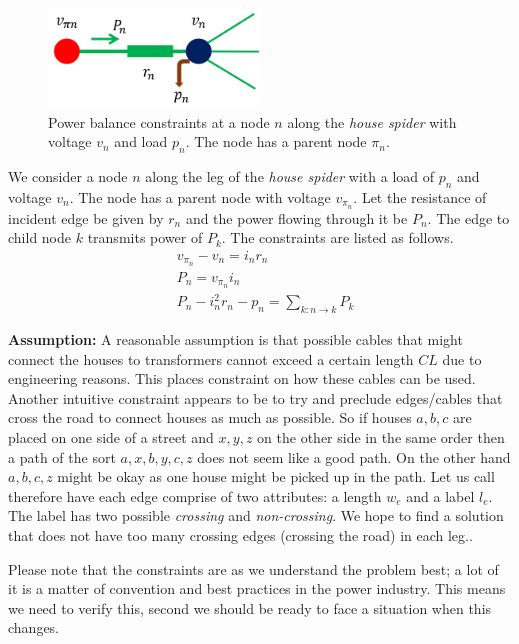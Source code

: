 \documentclass[11pt,letterpaper]{article}
\begin{document}
\begin{figure}[H]
	\centering
	\includegraphics[width=0.5\textwidth]{constraint-2}
	\caption{\color{blue}Power balance constraints at a node $n$ along the \emph{house spider} with voltage $v_n$ and load $p_n$. The node has a parent node $\pi_n$.}
	\label{fig-2}
\end{figure}
\noindent We consider a node $n$ along the leg of the \emph{house spider} with a load of $p_n$ and voltage $v_n$. The node has a parent node with voltage $v_{\pi_n}$. Let the resistance of incident edge be given by $r_n$ and the power flowing through it be $P_n$. The edge to child node $k$ transmits power of $P_k$. The constraints are listed as follows.
\begin{equation}
\begin{aligned}
&v_{\pi_n}-v_n=i_nr_n\\
&P_n=v_{\pi_n}i_n\\
&P_n-i_n^2r_n-p_n=\sum_{k:n\rightarrow k}P_k
\end{aligned}
\end{equation}

\color{black}
\noindent
\textbf{Assumption:} A reasonable assumption is that possible cables that might connect the houses to transformers cannot exceed a certain length 
$CL$ due to engineering reasons. This places constraint on how these cables can be used. Another intuitive constraint appears to
be to try and preclude edges/cables that cross the road to connect houses as much as possible. So if houses $a,b,c$ are placed on one side of a street and $x,y,z$ on the other side in the same order then a path of the sort $a,x,b,y,c,z$ does not seem like a good path. On the other hand
$a,b,c,z$ might be okay as one house might be picked up in the path.  Let us call therefore have each edge comprise of two attributes:
a length $w_e$ and a label $l_e$.  The label has two possible \emph{crossing} and \emph{non-crossing}. We hope to find a solution that
does not have too many crossing edges (crossing the road) in each leg..

Please note that the constraints are as we understand the problem best; a lot of it is a matter of convention and best practices in the power industry. This means we need to verify this, second we should be ready to face a situation when this changes.
\end{document}
